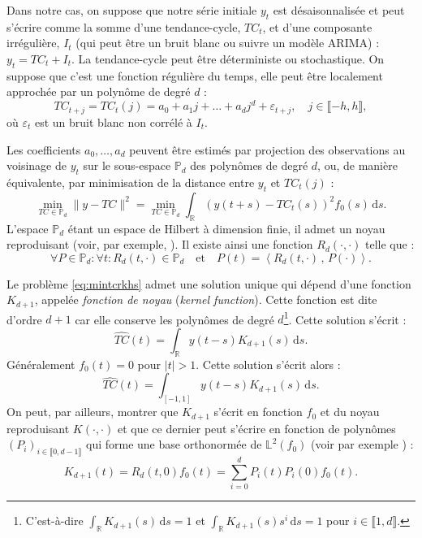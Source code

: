 \documentclass[
  12pt,
  a4paper,french]{article}
\newcommand\R{\mathds{R}}
\newcommand\1{\mathds{1}}
\newcommand\ud{\,\mathrm{d}}
\newcommand{\ps}[2]{\left\langle #1 \,,\, #2 \right\rangle}
\begin{document}
Dans notre cas, on suppose que notre série initiale \(y_t\) est désaisonnalisée et peut s'écrire comme la somme d'une tendance-cycle, \(TC_t\), et d'une composante irrégulière, \(I_t\) (qui peut être un bruit blanc ou suivre un modèle ARIMA) :
\(y_t=TC_t+I_t.\)
La tendance-cycle peut être déterministe ou stochastique. On suppose que c'est une fonction régulière du temps, elle peut être localement approchée par un polynôme de degré \(d\) :
\[
TC_{t+j}=TC_t(j)=a_0+a_1j+\dots+a_dj^d+\varepsilon_{t+j},\quad
j\in\llbracket-h,h\rrbracket,
\]
où \(\varepsilon_t\) est un bruit blanc non corrélé à \(I_t\).

Les coefficients \(a_0,\dots,a_d\) peuvent être estimés par projection des observations au voisinage de \(y_t\) sur le sous-espace \(\mathbb P_d\) des polynômes de degré \(d\), ou, de manière équivalente, par minimisation de la distance entre \(y_t\) et \(TC_t(j)\) :
\begin{equation}
\underset{TC\in\mathbb P_d}{\min}\lVert y -TC \rVert^2 = 
\underset{TC\in\mathbb P_d}{\min}\int_\R (y(t+s)-TC_t(s))^2f_0(s)\ud s.
\label{eq:mintcrkhs}
\end{equation}
L'espace \(\mathbb P_d\) étant un espace de Hilbert à dimension finie, il admet un noyau reproduisant (voir, par exemple, \textcite{berlinet2004}).
Il existe ainsi une fonction \(R_d(\cdot,\cdot)\) telle que :
\[
\forall P\in \mathbb P_d: \forall t:
R_d(t,\cdot)\in\mathbb P_d\quad\text{et}\quad
P(t)=\ps{R_d(t,\cdot)}{P(\cdot)}.
\]

Le problème \eqref{eq:mintcrkhs} admet une solution unique qui dépend d'une fonction \(K_{d+1}\), appelée \emph{fonction de noyau} (\emph{kernel function}).
Cette fonction est dite d'ordre \(d+1\) car elle conserve les polynômes de degré \(d\)\footnote{
  C'est-à-dire \(\int_\R K_{d+1}(s)\ud s = 1\) et \(\int_\R K_{d+1}(s) s^i\ud s = 1\) pour \(i\in \llbracket 1, d\rrbracket\).}.
Cette solution s'écrit :
\begin{equation}
\widehat{TC}(t)=\int_\R y(t-s)K_{d+1}(s) \ud s.
\label{eq:rkhssoltc}
\end{equation}
Généralement \(f_0(t) = 0\) pour \(\lvert t \rvert>1\).
Cette solution s'écrit alors :
\begin{equation}
\widehat{TC}(t)=\int_{[-1,1]} y(t-s)K_{d+1}(s) \ud s.
\label{eq:rkhssoltc2}
\end{equation}
On peut, par ailleurs, montrer que \(K_{d+1}\) s'écrit en fonction \(f_0\) et du noyau reproduisant \(K(\cdot,\cdot)\) et que ce dernier peut s'écrire en fonction de polynômes \((P_i)_{i\in \llbracket 0, d-1 \rrbracket}\) qui forme une base orthonormée de \(\mathbb L^2(f_0)\) (voir par exemple \textcite{berlinet1993}) :
\[
K_{d+1}(t) = R_d(t,0)f_0(t) = \sum_{i=0}^dP_i(t)P_i(0)f_0(t).
\]
\end{document}
